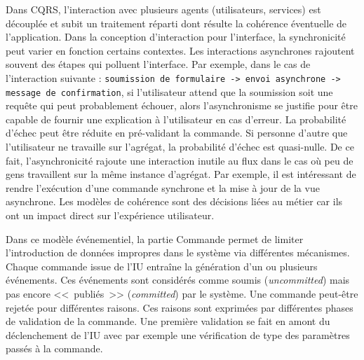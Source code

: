 Dans \gls{CQRS}, l'interaction avec plusieurs agents (utilisateurs, services) est 
découplée et subit un traitement réparti 
dont résulte la cohérence éventuelle de l'application. 
Dans la conception d'interaction pour l'interface, la synchronicité peut varier en 
fonction certains contextes. 
Les interactions asynchrones rajoutent souvent des étapes qui polluent l'interface.  
Par exemple, dans le cas de l'interaction suivante : \texttt{soumission de 
formulaire -> envoi asynchrone -> message de confirmation}, si l'utilisateur attend 
que la soumission soit une requête qui peut probablement échouer, alors 
l'asynchronisme se justifie pour être capable de fournir une explication à 
l'utilisateur en cas d'erreur. 
La probabilité d'échec peut être réduite en pré-validant la commande. Si personne 
d'autre que 
l'utilisateur ne travaille sur l'agrégat, la probabilité d'échec est quasi-nulle. De ce fait, 
l'asynchronicité rajoute une interaction inutile au flux dans le cas où peu de gens 
travaillent sur la même instance d'agrégat.
Par exemple, il est intéressant de rendre l'exécution d'une 
commande synchrone et la mise à jour de la vue asynchrone. Les modèles de 
cohérence sont des décisions liées au métier car ils ont un impact direct sur 
l'expérience utilisateur. 


Dans ce modèle événementiel, la partie Commande permet de limiter l'introduction 
de données impropres dans le système via différentes mécanismes. Chaque 
commande issue de l'\gls{IU} entraîne la génération d'un ou plusieurs événements. 
Ces événements sont considérés 
comme \og soumis\fg{} (\textit{uncommitted}) mais pas encore <<~publiés~>> 
(\textit{committed}) par le système.
Une commande peut-être rejetée pour différentes raisons. Ces raisons sont 
exprimées par différentes phases de validation de la commande.
Une première validation se fait en amont du déclenchement de l'\gls{IU} avec par 
exemple une vérification de type des paramètres passés à la commande.

%
%


